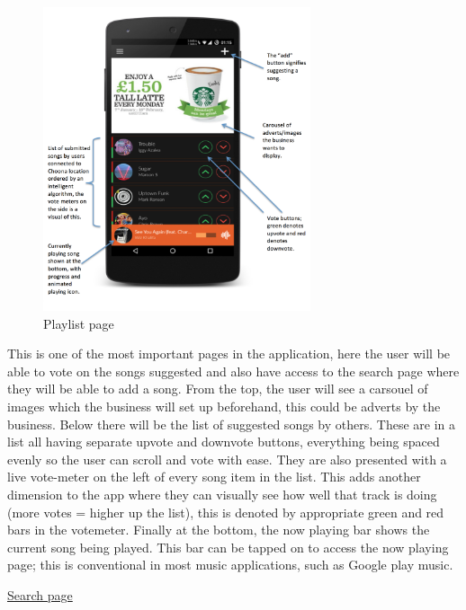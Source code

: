 \noindent
\begin{figure}[h!]
\centering
\includegraphics[width=0.7\textwidth]{./img/playlistannotated.png}
\caption{Playlist page}
\label{fig:playlist}
\end{figure}

This is one of the most important pages in the application, here the user will be able to vote on the songs suggested and also have access to the search page where they will be able to add a song. From the top, the user will see a carsouel of images which the business will set up beforehand, this could be adverts by the business. Below there will be the list of suggested songs by others. These are in a list all having separate upvote and downvote buttons, everything being spaced evenly so the user can scroll and vote with ease. They are also presented with a live vote-meter on the left of every song item in the list. This adds another dimension to the app where they can visually see how well that track is doing (more votes = higher up the list), this is denoted by appropriate green and red bars in the votemeter. Finally at the bottom, the now playing bar shows the current song being played. This bar can be tapped on to access the now playing page; this is conventional in most music applications, such as Google play music.

\clearpage


\noindent\underline{Search page}\newline

